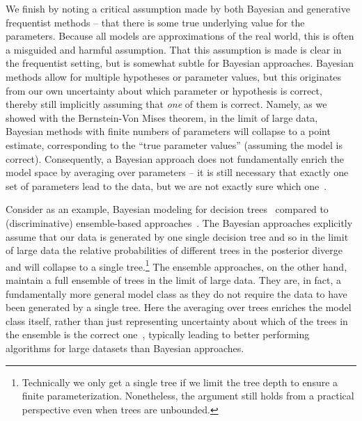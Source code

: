 We finish by noting a critical assumption made by both Bayesian and generative frequentist methods --
that there is some true underlying value for the parameters.  Because
all models are approximations of the real world, this is often a misguided and harmful assumption.  That this assumption
is made is clear in the frequentist setting, but is somewhat subtle for Bayesian approaches.
Bayesian methods allow for multiple hypotheses or parameter values, but this originates from our own uncertainty
about which parameter or hypothesis is correct, thereby still implicitly assuming that \emph{one} of them is correct.
Namely, as we showed with the Bernstein-Von Mises theorem,  in the limit of large data, Bayesian methods with finite numbers of parameters will collapse to a point estimate, 
corresponding to the ``true parameter values'' (assuming the model is correct).
Consequently, a Bayesian approach does not fundamentally enrich the model space by averaging over parameters -- it
is still necessary that exactly one set of parameters lead to the data, but we are not exactly sure which one~\citep{minka2000bayesian}.

Consider as an example, Bayesian modeling for decision trees~\citep{chipman1998bayesian,lakshminarayanan2013top}
compared to (discriminative) ensemble-based approaches~\citep{breiman2001random,rainforth2015canonical}.
The Bayesian approaches explicitly assume that our data is generated by one single decision tree and so in the limit of
large data the relative probabilities of different trees in the posterior diverge and will collapse to a
single tree.\footnote{Technically we only get a single tree 
	if we limit the tree depth to ensure a finite parameterization.  Nonetheless, the argument still
	holds from a practical perspective even when trees are unbounded.}  The ensemble approaches, on the other hand, maintain
a full ensemble of trees in the limit of large data.  They are, in fact, a fundamentally more general model class
as they do not require the data to have been generated by a single tree.  Here the averaging over trees enriches the
model class itself, rather than just representing uncertainty about which of the trees in the ensemble is the correct 
one~\citep{domingos1997does}, typically leading to better performing algorithms for large datasets than Bayesian approaches.